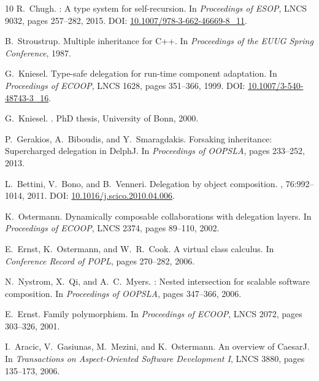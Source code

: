 \documentclass[acmsmall,screen,review,anonymous]{acmart}
\theoremstyle{acmplain}
\begin{document}
\begin{thebibliography}{10}
R.~Chugh.
: A type system for self-recursion.
\newblock In {\em Proceedings of ESOP}, LNCS 9032, pages 257--282, 2015.
\newblock DOI: \href{https://doi.org/10.1007/978-3-662-46669-8_11}{10.1007/978-3-662-46669-8\_11}.

B.~Stroustrup.
\newblock Multiple inheritance for {C++}.
\newblock In {\em Proceedings of the EUUG Spring Conference}, 1987.

G.~Kniesel.
\newblock Type-safe delegation for run-time component adaptation.
\newblock In {\em Proceedings of ECOOP}, LNCS 1628, pages 351--366, 1999.
\newblock DOI: \href{https://doi.org/10.1007/3-540-48743-3_16}{10.1007/3-540-48743-3\_16}.

G.~Kniesel.
.
\newblock PhD thesis, University of Bonn, 2000.

P.~Gerakios, A.~Biboudis, and Y.~Smaragdakis.
\newblock Forsaking inheritance: Supercharged delegation in {DelphJ}.
\newblock In {\em Proceedings of OOPSLA}, pages 233--252, 2013.

L.~Bettini, V.~Bono, and B.~Venneri.
\newblock Delegation by object composition.
, 76:992--1014, 2011.
\newblock DOI: \href{https://doi.org/10.1016/j.scico.2010.04.006}{10.1016/j.scico.2010.04.006}.

K.~Ostermann.
\newblock Dynamically composable collaborations with delegation layers.
\newblock In {\em Proceedings of ECOOP}, LNCS 2374, pages 89--110, 2002.

E.~Ernst, K.~Ostermann, and W.~R.~Cook.
\newblock A virtual class calculus.
\newblock In {\em Conference Record of POPL}, pages 270--282, 2006.

N.~Nystrom, X.~Qi, and A.~C.~Myers.
: Nested intersection for scalable software composition.
\newblock In {\em Proceedings of OOPSLA}, pages 347--366, 2006.

E.~Ernst.
\newblock Family polymorphism.
\newblock In {\em Proceedings of ECOOP}, LNCS 2072, pages 303--326, 2001.

I.~Aracic, V.~Gasiunas, M.~Mezini, and K.~Ostermann.
\newblock An overview of {CaesarJ}.
\newblock In {\em Transactions on Aspect-Oriented Software Development I}, LNCS 3880, pages 135--173, 2006.


\end{thebibliography}
\end{document}
